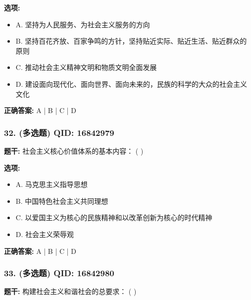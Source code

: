 \documentclass[12pt,UTF8]{ctexart}
\begin{document}
\textbf{选项:}
\begin{itemize}[leftmargin=*]

  \item A. 坚持为人民服务、为社会主义服务的方向

  \item B. 坚持百花齐放、百家争鸣的方针，坚持贴近实际、贴近生活、贴近群众的原则

  \item C. 推动社会主义精神文明和物质文明全面发展

  \item D. 建设面向现代化、面向世界、面向未来的，民族的科学的大众的社会主义文化

\end{itemize}

\textbf{正确答案:}
A | B | C | D

\vspace{0.3em}\hrulefill\vspace{0.7em}

\subsubsection*{32. (多选题) \small QID: 16842979}

\textbf{题干:}
社会主义核心价值体系的基本内容： ( )

\textbf{选项:}
\begin{itemize}[leftmargin=*]

  \item A. 马克思主义指导思想

  \item B. 中国特色社会主义共同理想

  \item C. 以爱国主义为核心的民族精神和以改革创新为核心的时代精神

  \item D. 社会主义荣辱观

\end{itemize}

\textbf{正确答案:}
A | B | C | D

\vspace{0.3em}\hrulefill\vspace{0.7em}

\subsubsection*{33. (多选题) \small QID: 16842980}

\textbf{题干:}
构建社会主义和谐社会的总要求： ( )
\end{document}
